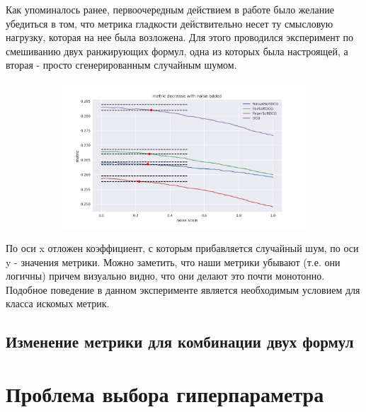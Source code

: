 \documentclass[14pt,a4paper]{amsart}
\theoremstyle{definition}
\theoremstyle{definition}
\begin{document}
Как упоминалось ранее, первоочередным действием в работе было желание убедиться в том, что метрика гладкости действительно несет ту смысловую нагрузку, которая на нее была возложена. Для этого проводился эксперимент по смешиванию двух ранжирующих формул, одна из которых была настроящей, а вторая - просто сгенерированным случайным шумом.

\begin{figure}[!h]
    \centering
    \begin{subfigure}{\textwidth}
    \centering
        \includegraphics[width=\textwidth]{noised_metrics}
     \end{subfigure}
\end{figure}

По оси x отложен коэффициент, с которым прибавляется случайный шум, по оси y - значения метрики. Можно заметить, что наши метрики убывают (т.е. они логичны) причем визуально видно, что они делают это почти монотонно. \\

Подобное поведение в данном эксперименте является необходимым условием для класса искомых метрик.


\subsection{Изменение метрики для комбинации двух формул}




\newpage
\section{Проблема выбора гиперпараметра}
\end{document}
